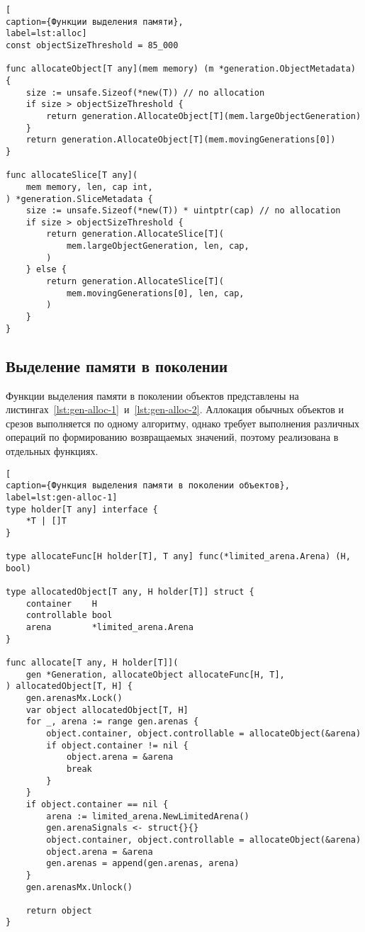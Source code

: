 \clearpage
\begin{lstlisting}[
caption={Функции выделения памяти},
label=lst:alloc]
const objectSizeThreshold = 85_000

func allocateObject[T any](mem memory) (m *generation.ObjectMetadata) {
	size := unsafe.Sizeof(*new(T)) // no allocation
	if size > objectSizeThreshold {
		return generation.AllocateObject[T](mem.largeObjectGeneration)
	}
	return generation.AllocateObject[T](mem.movingGenerations[0])
}

func allocateSlice[T any](
	mem memory, len, cap int,
) *generation.SliceMetadata {
	size := unsafe.Sizeof(*new(T)) * uintptr(cap) // no allocation
	if size > objectSizeThreshold {
		return generation.AllocateSlice[T](
			mem.largeObjectGeneration, len, cap,
		)
	} else {
		return generation.AllocateSlice[T](
			mem.movingGenerations[0], len, cap,
		)
	}
}
\end{lstlisting}



\subsection{Выделение памяти в поколении}

Функции выделения памяти в поколении объектов представлены на листингах~\ref{lst:gen-alloc-1}~и~\ref{lst:gen-alloc-2}. Аллокация обычных объектов и срезов выполняется по одному алгоритму, однако требует выполнения различных операций по формированию возвращаемых значений, поэтому реализована в отдельных функциях.

\clearpage
\begin{lstlisting}[
caption={Функция выделения памяти в поколении объектов},
label=lst:gen-alloc-1]
type holder[T any] interface {
	*T | []T
}

type allocateFunc[H holder[T], T any] func(*limited_arena.Arena) (H, bool)

type allocatedObject[T any, H holder[T]] struct {
	container    H
	controllable bool
	arena        *limited_arena.Arena
}

func allocate[T any, H holder[T]](
	gen *Generation, allocateObject allocateFunc[H, T],
) allocatedObject[T, H] {
	gen.arenasMx.Lock()
	var object allocatedObject[T, H]
	for _, arena := range gen.arenas {
		object.container, object.controllable = allocateObject(&arena)
		if object.container != nil {
			object.arena = &arena
			break
		}
	}
	if object.container == nil {
		arena := limited_arena.NewLimitedArena()
		gen.arenaSignals <- struct{}{}
		object.container, object.controllable = allocateObject(&arena)
		object.arena = &arena
		gen.arenas = append(gen.arenas, arena)
	}
	gen.arenasMx.Unlock()
	
	return object
}
\end{lstlisting}

